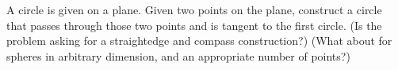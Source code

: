 A circle is given on a plane.
Given two points on the plane,
construct a circle that passes through those two points
and is tangent to the first circle.
\newline (Is the problem asking for a straightedge and compass construction?)
\newline
(What about for spheres in arbitrary dimension,
and an appropriate number of points?)
